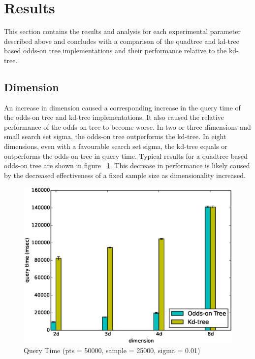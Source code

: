 \documentclass[mcs]{scsthesis}
\begin{document}
\section{Results}

This section contains the results and analysis for each experimental
parameter described above and concludes with a comparison of the quadtree and
kd-tree based odds-on tree implementations and their performance relative to
the kd-tree.

\subsection{Dimension}

An increase in dimension caused a corresponding increase in the query time of
the odds-on tree and kd-tree implementations. It also caused the relative
performance of the odds-on tree to become worse. In two or three
dimensions and small search set sigma, the odds-on tree outperforms the kd-tree.
In eight dimensions, even with a favourable search set sigma, the kd-tree
equals or outperforms the odds-on tree in query time. Typical results for a
quadtree based odds-on tree are shown in figure ~\ref{fig:dimension_ctime}. This
decrease in performance is likely caused by the decreased effectiveness of a
fixed sample size as dimensionality increased.

\begin{figure}
\begin{center}
\includegraphics[scale=0.5]{diagrams/dims_pts50000_sample25000_sigma0.01_qtime.eps}
\caption{Query Time (pts = 50000, sample = 25000, sigma = 0.01)}
\label{fig:dimension_ctime}
\end{center}
\end{figure}
\end{document}
